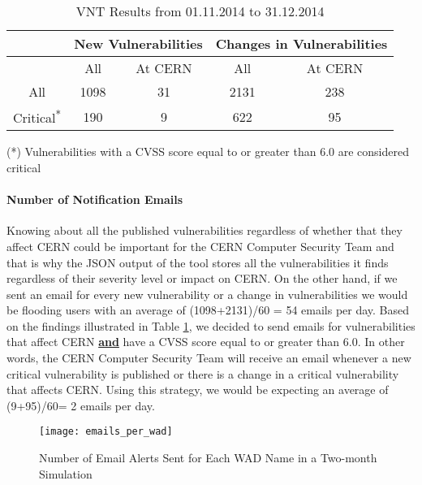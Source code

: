 \begin{table}[H]
\begin{center}
    \begin{tabular}{ | c || c | c || c | c |}
    
    \hline
	 
     &  \multicolumn{2}{c||}{New Vulnerabilities} &  \multicolumn{2}{c|}{Changes in Vulnerabilities}  
	\\ \hline   
      &  All &  At CERN &  All &  At CERN
    \\ 
	\hline    
       All & \multicolumn{1}{|c|}{\cellcolor{red!25}1098}   &  31 & \multicolumn{1}{|c|}{\cellcolor{red!25}2131}  & 238 
   \\ \hhline{|*5-}
\hhline{~~|-|~|-|}
Critical\textsuperscript{*} & 190  & \multicolumn{1}{|c||}{\cellcolor{green!25}9}  & 622  & \multicolumn{1}{|c|}{\cellcolor{green!25}95  }
    \\ \hline
    \end{tabular}
    \caption{VNT Results from 01.11.2014 to 31.12.2014}
    \label{table:vnt_results}
   \end{center}
   \footnotesize{(*) Vulnerabilities with a CVSS score equal to or greater than 6.0 are considered critical}
    \end{table}


\paragraph{Number of Notification Emails}
Knowing about all the published vulnerabilities regardless of whether that they affect CERN could be important for the CERN Computer Security Team and that is why the JSON output of the tool stores all the vulnerabilities it finds regardless of their severity level or impact on CERN. On the other hand, if we sent an email for every new vulnerability or a change in vulnerabilities we would be flooding users with an average of (1098+2131)/60 = 54 emails per day. Based on the findings illustrated in Table \ref{table:vnt_results}, we decided to send emails for vulnerabilities that affect CERN \underline{\textbf{and}} have a CVSS score equal to or greater than 6.0. In other words, the CERN Computer Security Team will receive an email whenever a new critical vulnerability is published or there is a change in a critical vulnerability that affects CERN. Using this strategy, we would be expecting an average of (9+95)/60= 2 emails per day. 
\begin{figure}[H]

  \centering
    \texttt{[image: emails\_per\_wad]}
  \caption{Number of Email Alerts Sent for Each WAD Name in a Two-month Simulation}
  \label{figure:emails_per_wad}
\end{figure}

